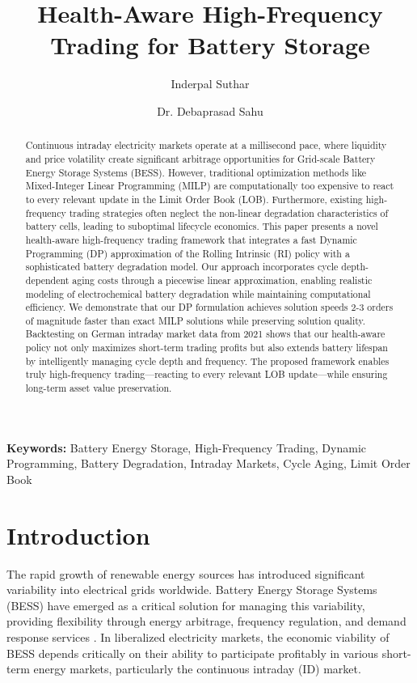 \documentclass[10pt,twocolumn]{article}
\title{Health-Aware High-Frequency Trading for Battery Storage}
\author[a]{Inderpal Suthar}
\author[a]{Dr. Debaprasad Sahu}
\affil[a]{\textit{Indian Institute of Technology Delhi}}
\date{}
\begin{document}
\maketitle

\begin{abstract}
Continuous intraday electricity markets operate at a millisecond pace, where liquidity and price volatility create significant arbitrage opportunities for Grid-scale Battery Energy Storage Systems (BESS). However, traditional optimization methods like Mixed-Integer Linear Programming (MILP) are computationally too expensive to react to every relevant update in the Limit Order Book (LOB). Furthermore, existing high-frequency trading strategies often neglect the non-linear degradation characteristics of battery cells, leading to suboptimal lifecycle economics. This paper presents a novel health-aware high-frequency trading framework that integrates a fast Dynamic Programming (DP) approximation of the Rolling Intrinsic (RI) policy with a sophisticated battery degradation model. Our approach incorporates cycle depth-dependent aging costs through a piecewise linear approximation, enabling realistic modeling of electrochemical battery degradation while maintaining computational efficiency. We demonstrate that our DP formulation achieves solution speeds 2-3 orders of magnitude faster than exact MILP solutions while preserving solution quality. Backtesting on German intraday market data from 2021 shows that our health-aware policy not only maximizes short-term trading profits but also extends battery lifespan by intelligently managing cycle depth and frequency. The proposed framework enables truly high-frequency trading—reacting to every relevant LOB update—while ensuring long-term asset value preservation.
\end{abstract}

\textbf{Keywords:} Battery Energy Storage, High-Frequency Trading, Dynamic Programming, Battery Degradation, Intraday Markets, Cycle Aging, Limit Order Book

\section{Introduction}

The rapid growth of renewable energy sources has introduced significant variability into electrical grids worldwide. Battery Energy Storage Systems (BESS) have emerged as a critical solution for managing this variability, providing flexibility through energy arbitrage, frequency regulation, and demand response services \cite{martinez2023dynamical, ullah2024comprehensive}. In liberalized electricity markets, the economic viability of BESS depends critically on their ability to participate profitably in various short-term energy markets, particularly the continuous intraday (ID) market.
\end{document}
